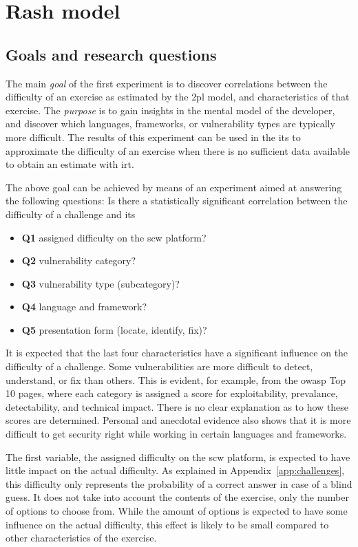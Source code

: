 \section{Rash model}
\label{sec:eval-rasch}

\subsection{Goals and research questions}
The main \textit{goal} of the first experiment is to discover correlations between the difficulty of an exercise as estimated by the \gls{2pl} model, and characteristics of that exercise.
The \textit{purpose} is to gain insights in the mental model of the developer, and discover which languages, frameworks, or vulnerability types are typically more difficult.
The results of this experiment can be used in the \gls{its} to approximate the difficulty of an exercise when there is no sufficient data available to obtain an estimate with \gls{irt}.

The above goal can be achieved by means of an experiment aimed at answering the following questions:
Is there a statistically significant correlation between the difficulty of a challenge and its
\begin{itemize}
    \item \textbf{Q1} assigned difficulty on the \gls{scw} platform?
    \item \textbf{Q2} vulnerability category?
    \item \textbf{Q3} vulnerability type (subcategory)?
    \item \textbf{Q4} language and framework?
    \item \textbf{Q5} presentation form (locate, identify, fix)?
\end{itemize}

It is expected that the last four characteristics have a significant influence on the difficulty of a challenge.
Some vulnerabilities are more difficult to detect, understand, or fix than others.
This is evident, for example, from the \gls{owasp} Top 10 pages, where each category is assigned a score for exploitability, prevalance, detectability, and technical impact.
There is no clear explanation as to how these scores are determined.
Personal and anecdotal evidence also shows that it is more difficult to get security right while working in certain languages and frameworks.

The first variable, the assigned difficulty on the \gls{scw} platform, is expected to have little impact on the actual difficulty.
As explained in Appendix~\ref{app:challenges}, this difficulty only represents the probability of a correct answer in case of a blind guess.
It does not take into account the contents of the exercise, only the number of options to choose from.
While the amount of options is expected to have some influence on the actual difficulty, this effect is likely to be small compared to other characteristics of the exercise.

